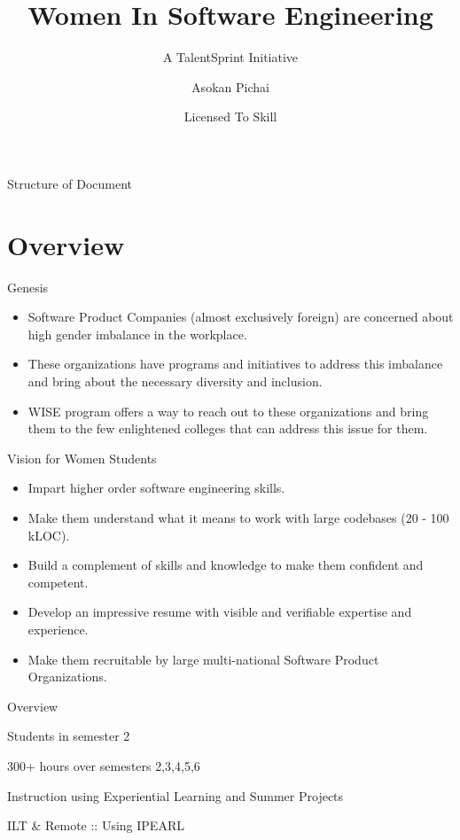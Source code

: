 \documentclass[12pt]{beamer}
\title[WISE]{Women In Software Engineering}
\subtitle{A TalentSprint Initiative}
\author[WISE]{Asokan Pichai}
\institute[TalentSprint]{TalentSprint}
\date{Licensed To Skill}
\begin{document}
{\large
\maketitle

\begin{frame}{Structure of Document}
  \tableofcontents
\end{frame}

\section{Overview}
\begin{frame}{Genesis}
  \begin{itemize}
	  \item Software Product Companies (almost exclusively foreign) are concerned about high gender imbalance in the workplace.
  \item These organizations have programs and initiatives to address this imbalance and bring about the necessary diversity and inclusion.
  \item WISE program offers a way to reach out to these organizations and bring them to the few enlightened colleges that can address this issue for them.
  \end{itemize}
\end{frame}  

\begin{frame}{Vision for Women Students}  
  \begin{itemize}
  \item Impart higher order software engineering skills.
  \item Make them understand what it means to work with large codebases (20 - 100 kLOC).
  \item Build a complement of skills and knowledge to make them confident and competent.
  \item Develop an impressive resume with visible and verifiable expertise and experience.
  \item Make them recruitable by large multi-national Software Product Organizations.
  \end{itemize}
\end{frame}

\begin{frame}{Overview}
  \begin{description}[DURATION]
  \item[Audience] Students in semester 2
  \item[Duration] 300+ hours over semesters 2,3,4,5,6 
  \item[Mode] Instruction using Experiential Learning and Summer Projects
  \item[Delivery] ILT \& Remote :: Using IPEARL 
  \end{description}
\end{frame}

}
\end{document}
